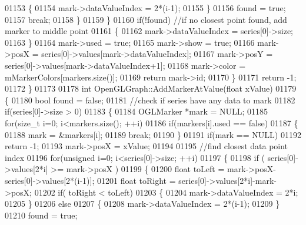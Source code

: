 \begin{DoxyCode}
{{{{{{{{{{01153                 \{
01154                     mark->dataValueIndex = 2*(i-1);
01155                 \}
01156                 found = \textcolor{keyword}{true};
01157                 \textcolor{keywordflow}{break};
01158             \}
01159         \}
01160         \textcolor{keywordflow}{if}(!found) \textcolor{comment}{//if no closest point found, add marker to middle point}
01161         \{
01162             mark->dataValueIndex = series[0]->size;
01163         \}
01164         mark->used = \textcolor{keyword}{true};
01165         mark->show = \textcolor{keyword}{true};
01166         mark->posX = series[0]->values[mark->dataValueIndex];
01167         mark->posY = series[0]->values[mark->dataValueIndex+1];
01168         mark->color = mMarkerColors[markers.size()];
01169         \textcolor{keywordflow}{return} mark->id;
01170     \}
01171     \textcolor{keywordflow}{return} -1;
01172 \}
01173 
01178 \textcolor{keywordtype}{int} OpenGLGraph::AddMarkerAtValue(\textcolor{keywordtype}{float} xValue)
01179 \{
01180     \textcolor{keywordtype}{bool} found = \textcolor{keyword}{false};
01181     \textcolor{comment}{//check if series have any data to mark}
01182     \textcolor{keywordflow}{if}(series[0]->size > 0)
01183     \{
01184         OGLMarker *mark = NULL;
01185         \textcolor{keywordflow}{for}(\textcolor{keywordtype}{size\_t} i=0; i<markers.size(); ++i)
01186             \textcolor{keywordflow}{if}(markers[i].used == \textcolor{keyword}{false})
01187             \{
01188                 mark = &markers[i];
01189                 \textcolor{keywordflow}{break};
01190             \}
01191         \textcolor{keywordflow}{if}(mark == NULL)
01192             \textcolor{keywordflow}{return} -1;
01193         mark->posX = xValue;
01194 
01195         \textcolor{comment}{//find closest data point index}
01196         \textcolor{keywordflow}{for}(\textcolor{keywordtype}{unsigned} i=0; i<series[0]->size; ++i)
01197         \{
01198             \textcolor{keywordflow}{if} ( series[0]->values[2*i] >= mark->posX )
01199             \{
01200                 \textcolor{keywordtype}{float} toLeft = mark->posX-series[0]->values[2*(i-1)];
01201                 \textcolor{keywordtype}{float} toRight = series[0]->values[2*i]-mark->posX;
01202                 \textcolor{keywordflow}{if}( toRight < toLeft)
01203                 \{
01204                     mark->dataValueIndex = 2*i;
01205                 \}
01206                 \textcolor{keywordflow}{else}
01207                 \{
01208                     mark->dataValueIndex = 2*(i-1);
01209                 \}
01210                 found = \textcolor{keyword}{true};
}}}}}}}}}}
\end{DoxyCode}
